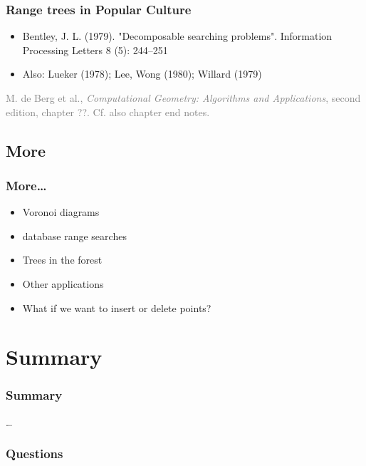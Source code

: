 \documentclass{beamer}
\begin{document}
\begin{frame}
  \frametitle{Range trees in Popular Culture}
  \begin{itemize}
  \item Bentley, J. L. (1979). "Decomposable searching
    problems". Information Processing Letters 8 (5): 244–251
  \item Also: Lueker (1978); Lee, Wong (1980); Willard (1979)
  \end{itemize}

  \bigskip \textcolor{gray}{ 
    M. de Berg et al., \textit{Computational Geometry: Algorithms and
      Applications}, second edition, chapter ??.  Cf. also chapter end
    notes.}


\end{frame}

\subsection{More}

\begin{frame}
  \frametitle{More\dots}
  \begin{itemize}
  \item Voronoi diagrams
  \item database range searches
  \item Trees in the forest
  \item Other applications
  \item What if we want to insert or delete points?
  \end{itemize}
\end{frame}


\section*{Summary}

\begin{frame}
  \frametitle{Summary}  
  \dots
\end{frame}

\begin{frame}
  \frametitle{Questions}  
\end{frame}
\end{document}
